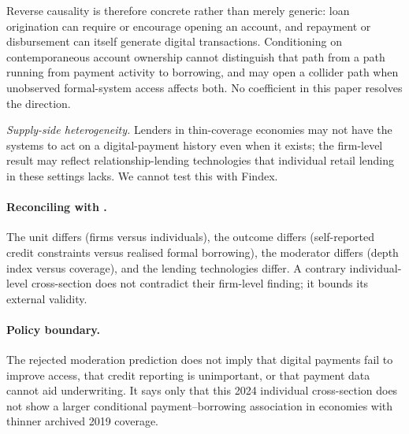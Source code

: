 Reverse causality is therefore concrete rather than merely generic: loan origination can require
or encourage opening an account, and repayment or disbursement can itself generate digital
transactions. Conditioning on contemporaneous account ownership cannot distinguish that path
from a path running from payment activity to borrowing, and may open a collider path when
unobserved formal-system access affects both. No coefficient in this paper resolves the direction.

\emph{Supply-side heterogeneity.} Lenders in thin-coverage economies may not have the
systems to act on a digital-payment history even when it exists; the firm-level result may
reflect relationship-lending technologies that individual retail lending in these settings
lacks. We cannot test this with Findex.

\paragraph{Reconciling with \citet{GalileaFaraziMare2026}.} The unit differs (firms versus
individuals), the outcome differs (self-reported credit constraints versus realised formal
borrowing), the moderator differs (depth index versus coverage), and the lending
technologies differ. A contrary individual-level cross-section does not contradict their
firm-level finding; it bounds its external validity.

\paragraph{Policy boundary.} The rejected moderation prediction does not imply that digital
payments fail to improve access, that credit reporting is unimportant, or that payment data
cannot aid underwriting. It says only that this 2024 individual cross-section does not show
a larger conditional payment--borrowing association in economies with thinner archived 2019
coverage.

